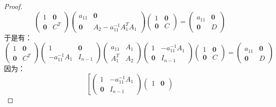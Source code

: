 \begin{proof}
	\begin{equation*}
		\begin{pmatrix}
			1 & \mathbf{0} \\
			\mathbf{0} & C^T
		\end{pmatrix}
		\begin{pmatrix}
			a_{11} & \mathbf{0} \\
			\mathbf{0} & A_2-a_{11}^{-1}A_1^TA_1
		\end{pmatrix}
		\begin{pmatrix}
		1 & \mathbf{0} \\
		\mathbf{0} & C
		\end{pmatrix}
		=
		\begin{pmatrix}
			a_{11} & \mathbf{0} \\
			\mathbf{0} & D
		\end{pmatrix}
	\end{equation*}
	于是有：
	\begin{equation*}
		\begin{pmatrix}
			1 & \mathbf{0} \\
			\mathbf{0} & C^T
		\end{pmatrix}
		\begin{pmatrix}
			1 & \mathbf{0} \\
			-a_{11}^{-1}A_1 & I_{n-1}
		\end{pmatrix}
		\begin{pmatrix}
			a_{11} & A_1 \\
			A_1^T & A_2
		\end{pmatrix}
		\begin{pmatrix}
			1 & -a_{11}^{-1}A_1 \\
			\mathbf{0} & I_{n-1}
		\end{pmatrix}
		\begin{pmatrix}
			1 & \mathbf{0} \\
			\mathbf{0} & C
		\end{pmatrix}
		=
		\begin{pmatrix}
			a_{11} & \mathbf{0} \\
			\mathbf{0} & D
		\end{pmatrix}
	\end{equation*}
	因为：
	\begin{equation*}
		\left[
		\begin{pmatrix}
			1 & -a_{11}^{-1}A_1 \\
			\mathbf{0} & I_{n-1}
		\end{pmatrix}
		\begin{pmatrix}
			1 & \mathbf{0} \\

\end{pmatrix}
\end{equation*}
\end{proof}
